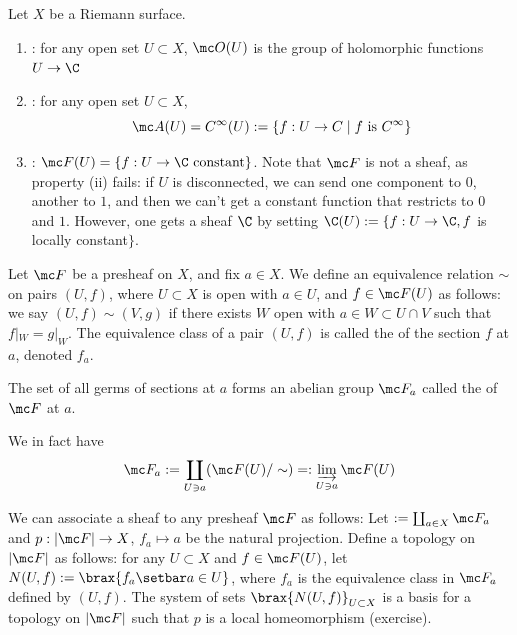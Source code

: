 \documentclass[11pt]{report}
\begin{document}
\begin{ex}
    Let $X$ be a Riemann surface.
    \begin{enumerate}
        \item {}: for any open set $U \subset X$, $\mc O(U)$ is the group of holomorphic functions $U \to \C$
        \item {}: for any open set $U \subset X$, \[ \mc A(U) = C^\infty (U):= \{f:U \to C \mid f \text{ is } C^\infty \} \]
        \item {}: $\mc F(U) = \{ f:U \to \C \text{ constant}\}$. Note that $\mc F$ is not a sheaf, as property (ii) fails: if $U$ is disconnected, we can send one component to $0$, another to $1$, and then we can't get a constant function that restricts to $0$ and $1$. However, one gets a sheaf $\C$ by setting $\C(U) := \{ f:U \to \C, f$ is locally constant$\}$.
    \end{enumerate}
\end{ex}

\begin{defn}
    Let $\mc F$ be a presheaf on $X$, and fix $a \in X$. We define an equivalence relation $\sim$ on pairs $(U,f)$, where $U\subset X$ is open with $a \in U$, and $f \in \mc F(U)$ as follows: we say $(U, f) \sim (V,g)$ if there exists $W$ open with $a \in W \subset U \cap V$ such that $f|_W = g|_W$. The equivalence class of a pair $(U,f)$ is called the  of the section $f$ at $a$, denoted $f_a$. 
    
    The set of all germs of sections at $a$ forms an abelian group $\mc F_a$ called the  of $\mc F$ at $a$.
\end{defn}

\begin{notethm*}
    We in fact have
    \[
    \mc F_a := \coprod _{U \ni a} (\mc F(U)/\sim) =: \varinjlim_{U \ni a} \mc F(U) 
    \]
\end{notethm*}
We can associate a sheaf to any presheaf $\mc F$ as follows: Let \term{$|\cF|$}$:=\coprod_{a \in X}\mc F_a$ and $p:|\mc F| \to X$, $f_a \mapsto a$ be the natural projection. Define a topology on $|\mc F|$ as follows: for any $U \subset X$ and $f \in \mc F(U)$, let $N(U,f):=\brax{f_a \setbar a \in U}$, where $f_a$ is the equivalence class in $\mc F_a$ defined by $(U, f)$. The system of sets $\brax{N(U,f)}_{U \subset X}$ is a basis for a topology on $|\mc F|$ such that $p$ is a local homeomorphism (exercise).
\end{document}
